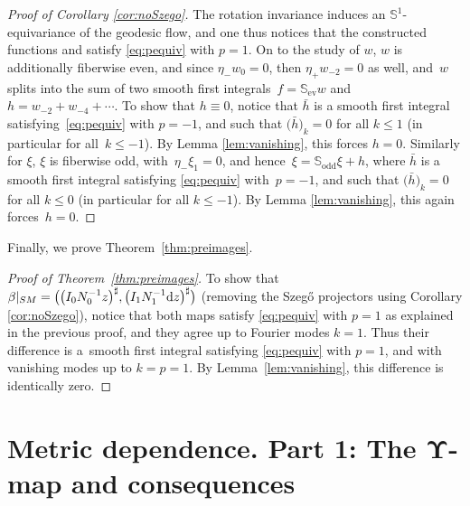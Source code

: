 \documentclass[10pt,a4paper]{amsart}
\numberwithin{equation}{section}
\theoremstyle{definition}
\newcommand{\1}{{\bf 1}}
\newcommand \Sm { \mathbb{S}}
\begin{document}
\begin{proof}[Proof of Corollary \ref{cor:noSzego}]
	{The rotation invariance induces an $\Sm^1$-equivariance of the geodesic flow, and one thus notices that the constructed functions}  and  satisfy \eqref{eq:pequiv} with $p=1$. On to the study of $w$, $w$ is additionally fiberwise even, and since $\eta_- w_0 = 0$, then $\eta_+ w_{-2} = 0$ as well, and~$w$ splits into the sum of two smooth first integrals~${f = \Sm_{\mathrm{ev}} w}$ and~${h = w_{-2} + w_{-4} + \cdots}$. To show that $h\equiv 0$, notice that $\bar{h}$ is a smooth first integral satisfying~\eqref{eq:pequiv} with $p=-1$, and such that $\bigl(\bar{h}\bigr)_k = 0$ for all $k\le 1$ (in particular for all~${k\le -1}$). By Lemma \eqref{lem:vanishing}, this forces $h=0$. Similarly for $\xi$, $\xi$ is fiberwise odd, with~${\eta_- \xi_1 = 0}$, and hence~${\xi = \Sm_{\mathrm{odd}} \xi + h}$, where $\bar{h}$ is a smooth first integral satisfying \eqref{eq:pequiv} with~${p=-1}$, and such that $\bigl(\bar{h}\bigr)_k = 0$ for all $k\le 0$ (in particular for all $k\le -1$). By Lemma \eqref{lem:vanishing}, this again forces~${h=0}$.	
\end{proof}

Finally, we prove Theorem~\ref{thm:preimages}.

\begin{proof}[Proof of Theorem~\ref{thm:preimages}]
	To show that $\beta|_{SM} = \bigl(\bigl(I_0 N_{0}^{-1}z\bigr)^\sharp,\bigl(I_1 N_{1}^{-1}{\rm d}z\bigr)^\sharp\bigr)$ (removing the Szeg\H{o} projectors using Corollary \ref{cor:noSzego}), notice that both maps satisfy \eqref{eq:pequiv} with $p=1$ {as explained in the previous proof}, and they agree up to Fourier modes $k=1$. Thus their difference is a~smooth first integral satisfying \eqref{eq:pequiv} with $p=1$, and with vanishing modes up to $k=p=1$. By Lemma~\ref{lem:vanishing}, this difference is identically zero.
\end{proof}

\section[Metric dependence. Part 1: The Upsilon-map and consequences]{Metric dependence. Part 1: The $\boldsymbol{\Upsilon}$-map and consequences}\label{s_upsilon}
\end{document}
